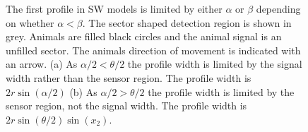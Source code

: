 \begin{figure}[t]
  \centering
{
}
\caption[The first profile in SW models]{
The first profile in SW models is limited by either $\alpha$ or $\beta$ depending on whether $\alpha < \beta$.
The sector shaped detection region is shown in grey.
Animals are filled black circles and the animal signal is an unfilled sector.
The animals direction of movement is indicated with an arrow.
(a)  As $\alpha/2 < \theta/2$ the profile width is limited by the signal width rather than the sensor region.
The profile width is $2r\sin\left(\alpha/2\right)$ (b) As $\alpha/2 > \theta/2$ the profile width is limited by the sensor region, not the signal width.
The profile width is $2r\sin\left(\theta/2\right)\sin(x_2)$.
}
\label{fig:forward}
\end{figure}


